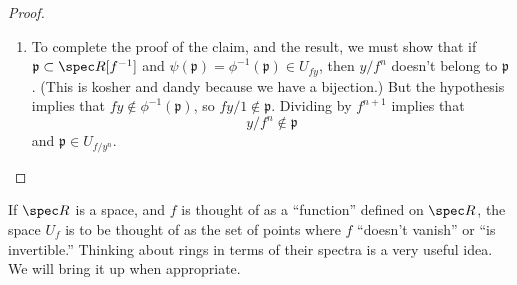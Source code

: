 \begin{proof}
\begin{enumerate}
We claim that
\[ \psi(U_{y/f^n}) = U_{fy} \subset \spec R.  \]
To see this, $\mathfrak{p}$ is contained in $U_{f/y^n}$. This
mean that
$\mathfrak{p}$ doesn't contain $y/f^n$. In particular,
$\mathfrak{p}$ doesn't
contain the multiple $yf/1$. So $\psi(\mathfrak{p})$ doesn't
contain $yf$.
This proves the inclusion $\subset$.  

\item 
To complete the proof of the claim, and
the result, we must show that if $\mathfrak{p} \subset \spec
R[f^{-1}]$ and
$\psi(\mathfrak{p}) = \phi^{-1}(\mathfrak{p}) \in U_{fy}$, then
$y/f^n$ doesn't
belong to $\mathfrak{p}$. (This is kosher and dandy because we
have a bijection.) But the hypothesis implies that $fy \notin
\phi^{-1}(\mathfrak{p})$, so $fy/1 \notin \mathfrak{p}$.
Dividing by $f^{n+1}$
implies that
\[ y/f^{n} \notin \mathfrak{p}  \]
and $\mathfrak{p} \in U_{f/y^n}$. 
\end{enumerate}
\end{proof}

If $\spec R$ is a space, and $f$ is thought of as a ``function''
defined on
$\spec R$, the space $U_f$ is to be thought of as the set of
points where $f$
``doesn't vanish'' or ``is invertible.''
Thinking about rings in terms of their spectra is a very useful
idea. We will bring it up when appropriate.  

